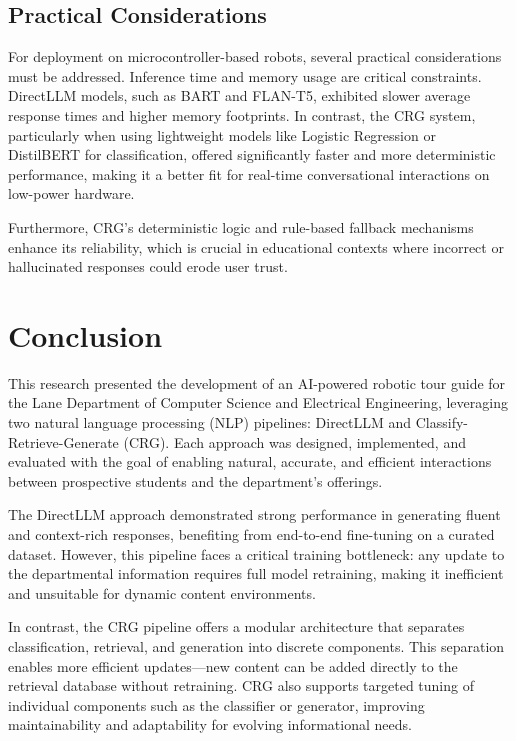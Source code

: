\documentclass[conference]{IEEEtran}
\begin{document}
\subsection{Practical Considerations}
For deployment on microcontroller-based robots, several practical considerations must be addressed. 
Inference time and memory usage are critical constraints. 
DirectLLM models, such as BART and FLAN-T5, exhibited slower average response times and higher memory footprints. 
In contrast, the CRG system, particularly when using lightweight models like Logistic Regression or DistilBERT for classification, offered significantly faster and more deterministic performance, making it a better fit for real-time conversational interactions on low-power hardware.

Furthermore, CRG's deterministic logic and rule-based fallback mechanisms enhance its reliability, which is crucial in educational contexts where incorrect or hallucinated responses could erode user trust.

\section{Conclusion}
This research presented the development of an AI-powered robotic tour guide for the Lane Department of Computer Science and Electrical Engineering, leveraging two natural language processing (NLP) pipelines: DirectLLM and Classify-Retrieve-Generate (CRG). 
Each approach was designed, implemented, and evaluated with the goal of enabling natural, accurate, and efficient interactions between prospective students and the department's offerings.

The DirectLLM approach demonstrated strong performance in generating fluent and context-rich responses, benefiting from end-to-end fine-tuning on a curated dataset. 
However, this pipeline faces a critical training bottleneck: any update to the departmental information requires full model retraining, making it inefficient and unsuitable for dynamic content environments.

In contrast, the CRG pipeline offers a modular architecture that separates classification, retrieval, and generation into discrete components. 
This separation enables more efficient updates—new content can be added directly to the retrieval database without retraining. 
CRG also supports targeted tuning of individual components such as the classifier or generator, improving maintainability and adaptability for evolving informational needs.
\end{document}
